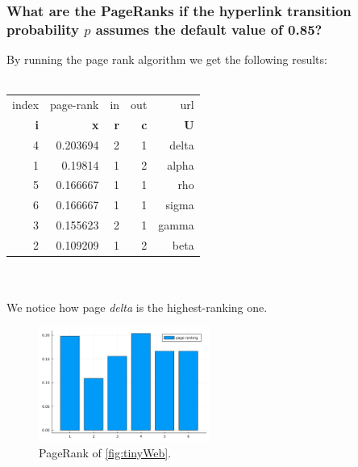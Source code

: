 \documentclass[unicode,11pt,a4paper,oneside,numbers=endperiod,openany]{scrartcl}
\begin{document}
\subsubsection{What are the PageRanks if the hyperlink transition probability $p$ assumes the default value of 0.85?}
By running the page rank algorithm we get the following results:\\\\
\begin{tabular}{|r|r|r|r|r|}
\hline
index & page-rank & in & out & url \\
{\color{teal}\textbf{i}} & \textbf{{\color{teal}x}} & \textbf{{\color{teal}r}} & \textbf{{\color{teal}c}} & \textbf{{\color{teal}U}} \\
\hline
4 &  0.203694 &  2 &   1 & delta \\
1 &   0.19814 &  1 &   2 & alpha \\
5 &  0.166667 &  1 &   1 & rho \\
6 &  0.166667 &  1 &   1 & sigma \\
3 &  0.155623 &  2 &   1 & gamma \\
2 &  0.109209 &  1 &   2 & beta \\
\hline
\end{tabular}\\\\
We notice how page \textit{delta} is the highest-ranking one.

\begin{figure}[h!]
    \centering
    \includegraphics[width=0.5\textwidth]{fig/fig5_pagerank.jpg}
    \caption{PageRank of \ref{fig:tinyWeb}.}
    \label{fig:fig5_pagerank}
\end{figure}
\end{document}
